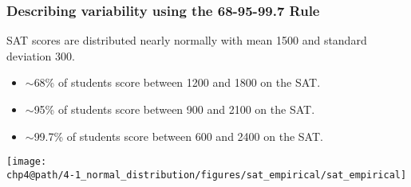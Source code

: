 \documentclass[slidestop,compress,mathserif]{beamer}
\makeatletter
\def\chp4@path{../../Chp 4}
\makeatother
\begin{document}

\begin{frame}
\frametitle{Describing variability using the 68-95-99.7 Rule}

SAT scores are distributed nearly normally with mean 1500 and standard deviation 300.

\pause
\begin{itemize}

\item $\sim$68\% of students score between 1200 and 1800 on the SAT. 

\item $\sim$95\% of students score between 900 and 2100 on the SAT. 

\item $\sim$99.7\% of students score between 600 and 2400 on the SAT. 

\end{itemize}

\begin{center}
\texttt{[image: \\chp4@path/4-1\_normal\_distribution/figures/sat\_empirical/sat\_empirical]}
\end{center}

\end{frame}

\end{document}
